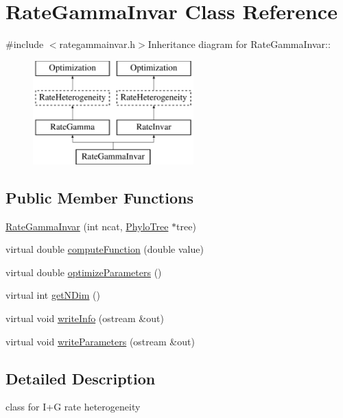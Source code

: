 \hypertarget{classRateGammaInvar}{
\section{RateGammaInvar Class Reference}
\label{classRateGammaInvar}
}


{\ttfamily \#include $<$rategammainvar.h$>$}Inheritance diagram for RateGammaInvar::\begin{figure}[H]
\begin{center}
\leavevmode
\includegraphics[height=4cm]{classRateGammaInvar}
\end{center}
\end{figure}
\subsection*{Public Member Functions}
\begin{DoxyCompactItemize}
\item 
\hyperlink{classRateGammaInvar_ada238d8306a13a7a9ad57fcb88349e48}{RateGammaInvar} (int ncat, \hyperlink{classPhyloTree}{PhyloTree} $\ast$tree)
\item 
virtual double \hyperlink{classRateGammaInvar_a48fde92a023867c5d0656572f8dc0f71}{computeFunction} (double value)
\item 
virtual double \hyperlink{classRateGammaInvar_ab72a2559cea978d312a243d521c2abef}{optimizeParameters} ()
\item 
virtual int \hyperlink{classRateGammaInvar_a4f276d1639a79eece217b365439049c7}{getNDim} ()
\item 
virtual void \hyperlink{classRateGammaInvar_a428c3ac79ba1bf28da546f602d4b0f7b}{writeInfo} (ostream \&out)
\item 
virtual void \hyperlink{classRateGammaInvar_a13b6629de9e3579aacff555f1bd76db5}{writeParameters} (ostream \&out)
\end{DoxyCompactItemize}


\subsection{Detailed Description}
class for I+G rate heterogeneity

